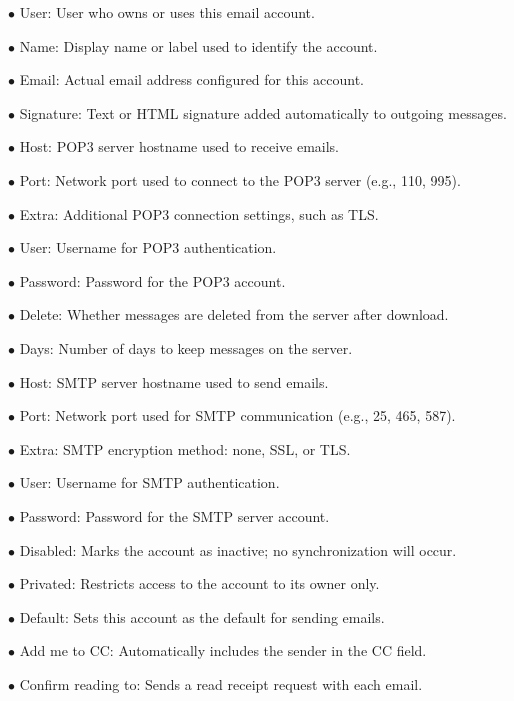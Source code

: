 \documentclass[a4paper]{article}
\begin{document}
\begin{compactitem}
\item[\color{myblue}$\bullet$] User: User who owns or uses this email account.
\item[\color{myblue}$\bullet$] Name: Display name or label used to identify the account.
\item[\color{myblue}$\bullet$] Email: Actual email address configured for this account.
\item[\color{myblue}$\bullet$] Signature: Text or HTML signature added automatically to outgoing messages.
\item[\color{myblue}$\bullet$] Host: POP3 server hostname used to receive emails.
\item[\color{myblue}$\bullet$] Port: Network port used to connect to the POP3 server (e.g., 110, 995).
\item[\color{myblue}$\bullet$] Extra: Additional POP3 connection settings, such as TLS.
\item[\color{myblue}$\bullet$] User: Username for POP3 authentication.
\item[\color{myblue}$\bullet$] Password: Password for the POP3 account.
\item[\color{myblue}$\bullet$] Delete: Whether messages are deleted from the server after download.
\item[\color{myblue}$\bullet$] Days: Number of days to keep messages on the server.
\item[\color{myblue}$\bullet$] Host: SMTP server hostname used to send emails.
\item[\color{myblue}$\bullet$] Port: Network port used for SMTP communication (e.g., 25, 465, 587).
\item[\color{myblue}$\bullet$] Extra: SMTP encryption method: none, SSL, or TLS.
\item[\color{myblue}$\bullet$] User: Username for SMTP authentication.
\item[\color{myblue}$\bullet$] Password: Password for the SMTP server account.
\item[\color{myblue}$\bullet$] Disabled: Marks the account as inactive; no synchronization will occur.
\item[\color{myblue}$\bullet$] Privated: Restricts access to the account to its owner only.
\item[\color{myblue}$\bullet$] Default: Sets this account as the default for sending emails.
\item[\color{myblue}$\bullet$] Add me to CC: Automatically includes the sender in the CC field.
\item[\color{myblue}$\bullet$] Confirm reading to: Sends a read receipt request with each email.
\end{compactitem}
\end{document}
